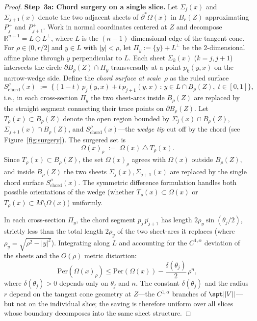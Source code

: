 \begin{proof}
\noindent\textbf{Step~3a: Chord surgery on a single slice.}
Let $\Sigma_j(x)$ and $\Sigma_{j+1}(x)$ denote the two adjacent sheets of $\partial^*\Omega(x)$ in $B_r(Z)$ approximating $P_j^+$ and $P_{j+1}^+$. Work in normal coordinates centered at $Z$ and decompose $\mathbb{R}^{n+1} = L \oplus L^\perp$, where $L$ is the $(n-1)$-dimensional edge of the tangent cone. For $\rho \in (0, r/2]$ and $y \in L$ with $|y| < \rho$, let $\Pi_y := \{y\} + L^\perp$ be the $2$-dimensional affine plane through $y$ perpendicular to $L$. Each sheet $\Sigma_k(x)$ ($k = j, j+1$) intersects the circle $\partial B_\rho(Z) \cap \Pi_y$ transversally at a point $p_k(y,x)$ on the narrow-wedge side. Define the \emph{chord surface at scale~$\rho$} as the ruled surface
\[
    S_{\mathrm{chord}}^{\rho}(x) \;:=\; \big\{(1-t)\, p_j(y,x) + t\, p_{j+1}(y,x) \,:\, y \in L \cap B_{\rho}(Z),\; t \in [0,1]\big\},
\]
i.e., in each cross-section $\Pi_y$ the two sheet-arcs inside $B_\rho(Z)$ are replaced by the straight segment connecting their trace points on $\partial B_\rho(Z)$. Let $T_{\rho}(x) \subset B_{\rho}(Z)$ denote the open region bounded by $\Sigma_j(x) \cap B_{\rho}(Z)$, $\Sigma_{j+1}(x) \cap B_{\rho}(Z)$, and $S_{\mathrm{chord}}^{\rho}(x)$---the \emph{wedge tip} cut off by the chord (see Figure~\ref{fig:surgery}). The surgered set is
\[
    \Omega(x)_\rho \;:=\; \Omega(x) \,\triangle\, T_\rho(x).
\]
Since $T_\rho(x) \subset B_\rho(Z)$, the set $\Omega(x)_\rho$ agrees with $\Omega(x)$ outside $B_\rho(Z)$, and inside $B_\rho(Z)$ the two sheets $\Sigma_j(x), \Sigma_{j+1}(x)$ are replaced by the single chord surface $S_{\mathrm{chord}}^{\rho}(x)$. The symmetric difference formulation handles both possible orientations of the wedge (whether $T_\rho(x) \subset \Omega(x)$ or $T_\rho(x) \subset M \setminus \Omega(x)$) uniformly.

In each cross-section $\Pi_y$, the chord segment $\overline{p_j\, p_{j+1}}$ has length $2\rho_y\sin(\theta_j/2)$, strictly less than the total length $2\rho_y$ of the two sheet-arcs it replaces (where $\rho_y = \sqrt{\rho^2 - |y|^2}$). Integrating along $L$ and accounting for the $C^{1,\alpha}$ deviation of the sheets and the $O(\rho)$ metric distortion:
\[
    \mathrm{Per}(\Omega(x)_\rho) \leq \mathrm{Per}(\Omega(x)) - \frac{\delta(\theta_j)}{2}\, \rho^n,
\]
where $\delta(\theta_j) > 0$ depends only on $\theta_j$ and $n$. The constant $\delta(\theta_j)$ and the radius $r$ depend on the tangent cone geometry at $Z$---the $C^{1,\alpha}$ branches of $\spt\|V\|$---but not on the individual slice; the saving is therefore uniform over all slices whose boundary decomposes into the same sheet structure.


\end{proof}
